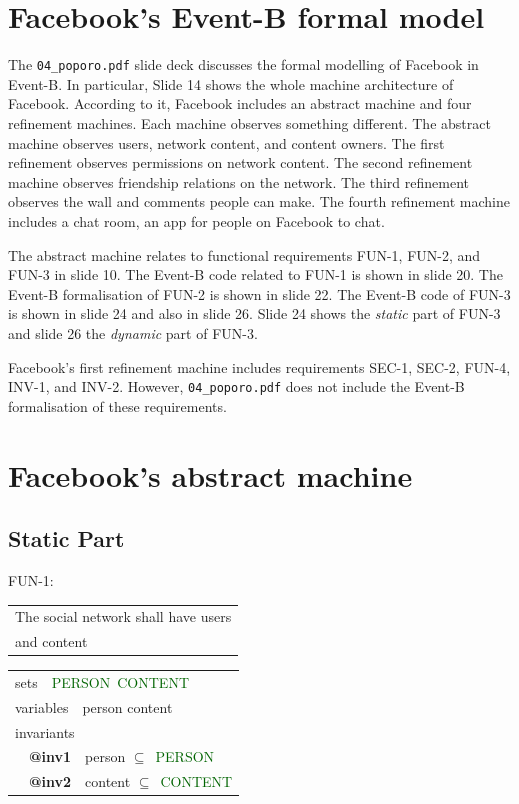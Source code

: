 \documentclass{article} %
\newcommand{\ebkeyw}[1]{\textcolor{pred}{\textsf{#1}}}
\newcommand{\ebtag}[1]{\textcolor{pgrey}{\textsf{\bf #1}}}
\newcommand{\ebsets}[1]{\textcolor{darkgreen}{\textsf{#1}}}
\begin{document}
\section{Facebook's Event-B formal model}
The \texttt{04\_\-poporo.\-pdf} slide deck discusses the formal modelling of Facebook in Event-B. In particular, Slide 14 shows the whole \textsf{machine} architecture of Facebook. According to it, Facebook includes an abstract machine and four refinement machines. Each machine observes something different. The abstract machine observes users, network content, and content owners. The first refinement observes permissions on network content. The second refinement machine observes friendship relations on the network. The third refinement observes the wall and comments people can make. The fourth refinement machine includes a chat room, an app for people on Facebook to chat.

The abstract machine relates to functional requirements FUN-1, FUN-2, and FUN-3 in slide 10. The Event-B code related to FUN-1 is shown in slide 20. The Event-B formalisation of FUN-2 is shown in slide 22. The Event-B code of FUN-3 is shown in slide 24 and also in slide 26. Slide 24 shows the \emph{static} part of FUN-3 and slide 26 the \emph{dynamic} part of FUN-3.

Facebook's first refinement machine includes requirements SEC-1, SEC-2, FUN-4, INV-1, and INV-2. However, \texttt{04\_\-poporo.\-pdf} does not include the Event-B formalisation of these requirements.


\section{Facebook's abstract machine}
\label{sec_abs}

\subsection{Static Part} 
\label{sec_abs_static}

\begin{center}
{\color{red!100}FUN-1}:
\begin{tabular}{|l|} \hline
The social network shall have users \\
and content \\
\hline
\end{tabular}
\end{center}

\begin{center}
\begin{tabular}{l}
\ebkeyw{sets}~~\ebsets{PERSON}~\ebsets{CONTENT} \\
\ebkeyw{variables}~~person content \\ 
\ebkeyw{invariants}\\
~~\ebtag{@inv1}~~person $\subseteq$~\ebsets{PERSON} \\
~~\ebtag{@inv2}~~content $\subseteq$~\ebsets{CONTENT} \\
\end{tabular}
\end{center}
\end{document}
